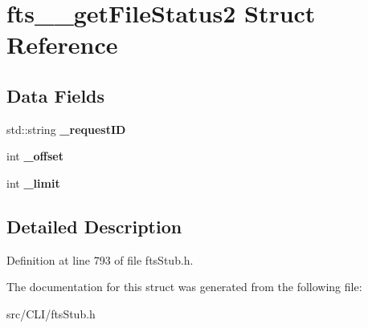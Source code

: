 \section{fts\_\-\_\-getFileStatus2 Struct Reference}
\label{structfts____getFileStatus2}
\subsection*{Data Fields}
\begin{DoxyCompactItemize}
\item 
std::string {\bfseries \_\-requestID}\label{structfts____getFileStatus2_ac2515730685f7360ada8af1be4b5ef10}

\item 
int {\bfseries \_\-offset}\label{structfts____getFileStatus2_acade497483fe573ed87d62bc21e43802}

\item 
int {\bfseries \_\-limit}\label{structfts____getFileStatus2_a4cde798e23901832be465158805cbb4d}

\end{DoxyCompactItemize}


\subsection{Detailed Description}


Definition at line 793 of file ftsStub.h.



The documentation for this struct was generated from the following file:\begin{DoxyCompactItemize}
\item 
src/CLI/ftsStub.h\end{DoxyCompactItemize}
